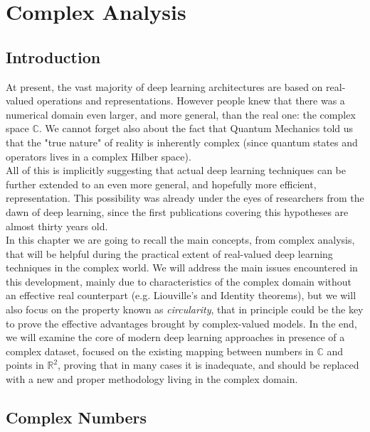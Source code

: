 \documentclass[../main.tex]{subfiles}
\begin{document}
\chapter{Complex Analysis}
\label{ch:cmplx_analysis}

\section*{Introduction}

At present, the vast majority of deep learning architectures are based on real-valued operations and representations. However people knew that there was a numerical domain even larger, and more general, than the real one: the complex space $\mathds{C}$. We cannot forget also about the fact that Quantum Mechanics told us that the "true nature" of reality is inherently complex (since quantum states and operators lives in a complex Hilber space).\\ 
All of this is implicitly suggesting that actual deep learning techniques can be further extended to an even more general, and hopefully more efficient, representation. This possibility was already under the eyes of researchers from the dawn of deep learning, since the first publications covering this hypotheses are almost thirty years old.\\
In this chapter we are going to recall the main concepts, from complex analysis, that will be helpful during the practical extent of real-valued deep learning techniques in the complex world. We will address the main issues encountered in this development, mainly due to characteristics of the complex domain without an effective real counterpart (e.g. Liouville's and Identity theorems), but we will also focus on the property known as \textit{circularity}, that in principle could be the key to prove the effective advantages brought by complex-valued models. In the end, we will examine the core of modern deep learning approaches in presence of a complex dataset, focused on the existing mapping between numbers in $\mathds{C}$ and points in $\mathds{R}^2$, proving that in many cases it is inadequate, and should be replaced with a new and proper methodology living in the complex domain.

\section{Complex Numbers}
\label{sec:cmplx_numbers}
\end{document}
